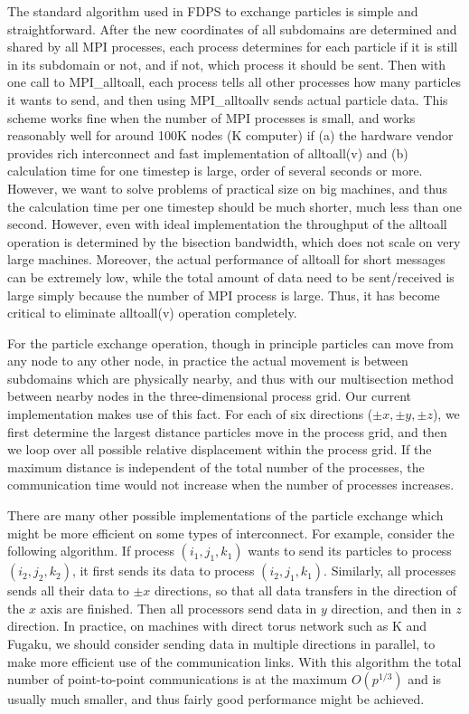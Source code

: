 The standard algorithm used in FDPS to exchange particles is simple
and straightforward. After the new coordinates of all subdomains are
determined and shared by all MPI processes, each process determines
for each particle if it is still in its subdomain or not, and if not,
which process it should be sent. Then with one call to
MPI\_alltoall, each process tells all other processes how many
particles it wants to send, and then using MPI\_alltoallv sends
actual particle data. This scheme  works fine when the number of MPI
processes is small, and works reasonably well for around 100K nodes (K
computer) if (a) the hardware vendor
provides  rich interconnect and   fast
implementation of alltoall(v) and (b) calculation time
for one timestep is large, order of several seconds or more. However,
we want to solve problems of practical size on big machines, and thus
the calculation time per one timestep should be much shorter, much less
than one second. However, even with ideal implementation the
throughput of the alltoall operation is determined by the bisection
bandwidth, which does not scale on very large machines. Moreover, the
actual performance of alltoall for short messages can be extremely
low, while the total amount of data need to be sent/received is large
simply because the number of MPI process is large. Thus, it has become
critical to eliminate  alltoall(v) operation completely.

For the particle exchange operation, though in principle particles can
move from any node to any other node, in practice the actual movement
is between subdomains which are physically nearby, and thus with our
multisection method between nearby nodes in the three-dimensional
process grid. Our current implementation makes use of this fact. For
each of six directions ($\pm x, \pm y, \pm z$), we first determine the
largest distance particles move in the process grid, and then we loop
over all possible relative displacement within the process grid. If
the maximum distance is independent of the total number of the
processes, the communication time would not increase when the number
of processes increases.

There are many other possible implementations of
the particle exchange which might be more efficient on some types of
interconnect. For example, consider the following algorithm.
If process $(i_1, j_1, k_1)$ wants to send its particles
to process $(i_2, j_2, k_2)$, it first sends its data to
process $(i_2, j_1, k_1)$. Similarly, all processes sends all their
data to $\pm x$ directions, so that all data transfers in the direction
of the  $x$ axis are finished. Then all processors send data in $y$
direction, and then in $z$ direction. In practice, on machines with
direct torus network such as K and Fugaku, we should consider sending
data in multiple directions in parallel, to make more efficient use of
the communication links. With this algorithm the total number of point-to-point
communications is at the maximum $O(p^{1/3})$ and is usually much
smaller, and thus fairly good performance might be achieved.

